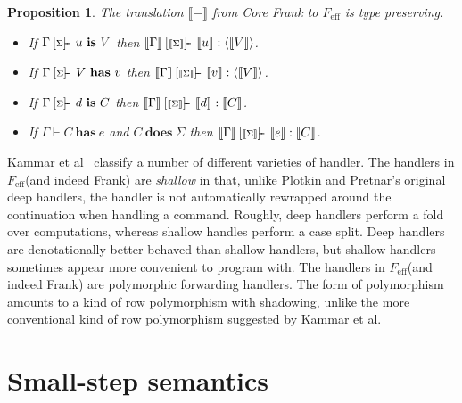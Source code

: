 \documentclass[preprint]{sigplanconf}
\makeatletter
\newcommand{\feff}{$F_\textrm{eff}$\xspace}
\newcommand{\set}[1]{\{#1\}}
\newcommand{\many}{\overline}
\newcommand{\sem}[1]{\llbracket{#1}\rrbracket}
\newcommand{\seml}{\left\llbracket}
\newcommand{\semr}{\right\rrbracket}
\newcommand{\FV}{\mathit{FV}}
\newcommand{\dom}{\mathit{dom}}
\newcommand\ba{\begin{array}}
\newcommand\ea{\end{array}}
\newcommand{\bl}{\ba{@{}c@{}}}
\newcommand{\el}{\ea}
\newcommand{\judgeword}[1]{~\mathbf{#1}~}
\newcommand{\sigentails}[1]{\mathbin{[{\text{\scriptsize ${#1}$}}]\!\text{-\!-}}\,}
\newcommand{\val}[3]  {#1 \vdash {#2} : {#3}}
\newcommand{\comp}[4]  {#1 \sigentails{#2} {#3} : {#4}}
\newcommand{\rt}[1]{\langle{#1}\rangle}   %
\newcommand{\makes}[4]  {#1 \sigentails{#2} {#3} \judgeword{is} {#4}}
\newcommand{\has}[4] {#1 \sigentails{#2} {#3} \judgeword{has} {#4}}
\newcommand{\can}[4]{#1 \sigentails{#2} {#3} \judgeword{is} {#4}}
\newcommand{\idoes}[3]{#1 \vdash {#2} \judgeword{has} {#3}}
\newcommand{\effs}[2]{{#1} \judgeword{does} {#2}}
\newcommand{\makesgs}{\makes{\Gamma}{\sigs}}
\newcommand{\hasgs}{\has{\Gamma}{\sigs}}
\newcommand{\cangs}{\can{\Gamma}{\sigs}}
\newcommand{\idoesg}{\idoes{\Gamma}}
\newtheorem{proposition}[theorem]{Proposition}
\newcommand{\sigs}{\Sigma}
\makeatother
\begin{document}
\begin{proposition}
The translation $\sem{-}$ from Core Frank to \feff is type preserving.
\begin{itemize}
\item If $\makesgs{u}{V}$ then $\comp{\sem{\Gamma}}{\sem{\sigs}}{\sem{u}}{\rt{\sem{V}}}$.
\item If $\hasgs{V}{v}$   then $\comp{\sem{\Gamma}}{\sem{\sigs}}{\sem{v}}{\rt{\sem{V}}}$.
\item If $\cangs{d}{C}$   then $\comp{\sem{\Gamma}}{\sem{\sigs}}{\sem{d}}{\sem{C}}$.
\item If $\idoesg{C}{e}$ and $\effs{C}{\sigs}$ then
  $\comp{\sem{\Gamma}}{\sem{\sigs}}{\sem{e}}{\sem{C}}$.
\end{itemize}
\end{proposition}

Kammar et al~\cite{KammarLO13} classify a number of different
varieties of handler.
%
The handlers in \feff (and indeed Frank) are \emph{shallow} in that,
unlike Plotkin and Pretnar's original deep handlers, the handler is
not automatically rewrapped around the continuation when handling a
command. Roughly, deep handlers perform a fold over computations,
whereas shallow handles perform a case split. Deep handlers are
denotationally better behaved than shallow handlers, but shallow
handlers sometimes appear more convenient to program with.
%
The handlers in \feff (and indeed Frank) are polymorphic forwarding
handlers. The form of polymorphism amounts to a kind of row
polymorphism with shadowing, unlike the more conventional kind of row
polymorphism suggested by Kammar et al.



\section{Small-step semantics}
\label{sec:semantics}
\end{document}
